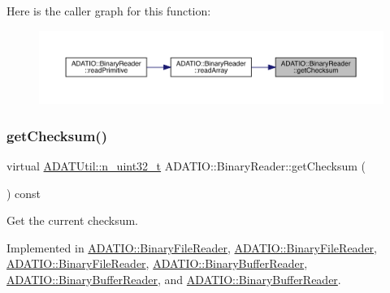 Here is the caller graph for this function\+:
\nopagebreak
\begin{figure}[H]
\begin{center}
\leavevmode
\includegraphics[width=350pt]{da/dd9/classADATIO_1_1BinaryReader_acd705bb96d557a5437410b55beb40bda_icgraph}
\end{center}
\end{figure}
\mbox{\label{classADATIO_1_1BinaryReader_acd705bb96d557a5437410b55beb40bda}} 
\subsubsection{\texorpdfstring{getChecksum()}{getChecksum()}\hspace{0.1cm}{\footnotesize\ttfamily [3/3]}}
{\footnotesize\ttfamily virtual \mbox{\hyperlink{namespaceADATUtil_ad945a8afa4db2d1f89b731964adae97e}{A\+D\+A\+T\+Util\+::n\+\_\+uint32\+\_\+t}} A\+D\+A\+T\+I\+O\+::\+Binary\+Reader\+::get\+Checksum (\begin{DoxyParamCaption}{ }\end{DoxyParamCaption}) const\hspace{0.3cm}{\ttfamily [pure virtual]}}



Get the current checksum. 



Implemented in \mbox{\hyperlink{classADATIO_1_1BinaryFileReader_addb0cfdf4c3df174327b1abc136cfc68}{A\+D\+A\+T\+I\+O\+::\+Binary\+File\+Reader}}, \mbox{\hyperlink{classADATIO_1_1BinaryFileReader_addb0cfdf4c3df174327b1abc136cfc68}{A\+D\+A\+T\+I\+O\+::\+Binary\+File\+Reader}}, \mbox{\hyperlink{classADATIO_1_1BinaryFileReader_addb0cfdf4c3df174327b1abc136cfc68}{A\+D\+A\+T\+I\+O\+::\+Binary\+File\+Reader}}, \mbox{\hyperlink{classADATIO_1_1BinaryBufferReader_ae8e6c22be76223f5e2ce2613e70be4bf}{A\+D\+A\+T\+I\+O\+::\+Binary\+Buffer\+Reader}}, \mbox{\hyperlink{classADATIO_1_1BinaryBufferReader_ae8e6c22be76223f5e2ce2613e70be4bf}{A\+D\+A\+T\+I\+O\+::\+Binary\+Buffer\+Reader}}, and \mbox{\hyperlink{classADATIO_1_1BinaryBufferReader_ae8e6c22be76223f5e2ce2613e70be4bf}{A\+D\+A\+T\+I\+O\+::\+Binary\+Buffer\+Reader}}.

